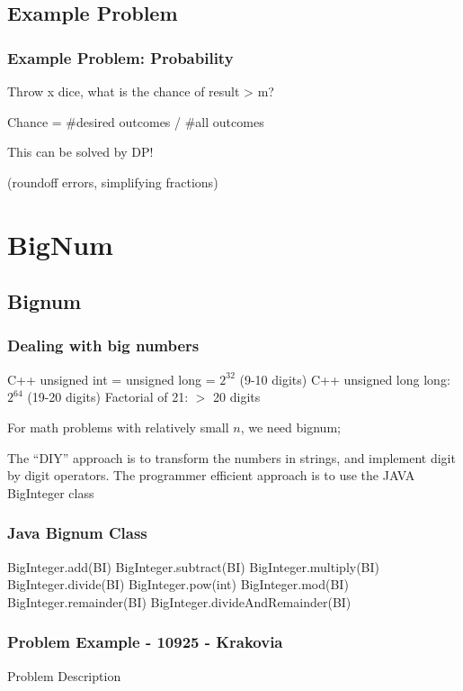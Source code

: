 \documentclass{beamer}
\begin{document}
\subsection{Example Problem} 
\begin{frame}
  \frametitle{Example Problem: Probability}

  Throw x dice, what is the chance of result > m?

  Chance = \#desired outcomes / \#all outcomes

  This can be solved by DP!

  (roundoff errors, simplifying fractions)

\end{frame}


\section{BigNum}
\subsection{Bignum}
\begin{frame}
  \frametitle{Dealing with big numbers}

  C++ unsigned int = unsigned long = $2^{32}$ (9-10 digits)
  C++ unsigned long long: $2^{64}$ (19-20 digits)
  Factorial of 21: $>$ 20 digits

  For math problems with relatively small $n$, we need bignum;

  The ``DIY'' approach is to transform the numbers in strings, and
  implement digit by digit operators. The programmer efficient
  approach is to use the JAVA BigInteger class
\end{frame}

\begin{frame}
  \frametitle{Java Bignum Class}
  BigInteger.add(BI)
  BigInteger.subtract(BI)
  BigInteger.multiply(BI)
  BigInteger.divide(BI)
  BigInteger.pow(int)
  BigInteger.mod(BI)
  BigInteger.remainder(BI)
  BigInteger.divideAndRemainder(BI)
\end{frame}

\begin{frame}
  \frametitle{Problem Example - 10925 - Krakovia}
  \begin{block}{Problem Description}
  \end{block}
  \begin{exampleblock}{}
\begin{verbatim}
\end{verbatim}
  \end{exampleblock}
\end{frame}
\end{document}
